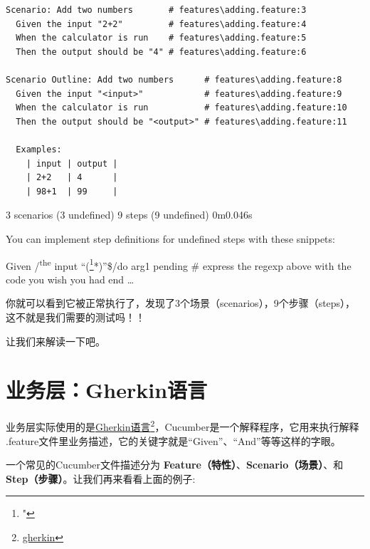 \begin{verbatim}
Scenario: Add two numbers       # features\adding.feature:3
  Given the input "2+2"         # features\adding.feature:4
  When the calculator is run    # features\adding.feature:5
  Then the output should be "4" # features\adding.feature:6

Scenario Outline: Add two numbers      # features\adding.feature:8
  Given the input "<input>"            # features\adding.feature:9
  When the calculator is run           # features\adding.feature:10
  Then the output should be "<output>" # features\adding.feature:11

  Examples:
    | input | output |
    | 2+2   | 4      |
    | 98+1  | 99     |
\end{verbatim}

3 scenarios (3 undefined)
 9 steps (9 undefined)
 0m0.046s

You can implement step definitions for undefined steps with these snippets:

Given \slash \textsuperscript{the} input ``(\footnote{"}*)''\$\slash  do \textbar{}arg1\textbar{}
 pending \# express the regexp above with the code you wish you had
 end
 {\ldots}

你就可以看到它被正常执行了，发现了3个场景（scenarios），9个步骤（steps），这不就是我们需要的测试吗！！

让我们来解读一下吧。

\section{业务层：Gherkin语言}
\label{业务层：gherkin语言}

业务层实际使用的是\href{gherkin}{Gherkin语言}\footnote{\href{gherkin}{gherkin}}，Cucumber是一个解释程序，它用来执行解释 .feature文件里业务描述，它的关键字就是“Given”、“And”等等这样的字眼。

一个常见的Cucumber文件描述分为 \textbf{Feature（特性）}、\textbf{Scenario（场景）}、和\textbf{Step（步骤）}。让我们再来看看上面的例子:

